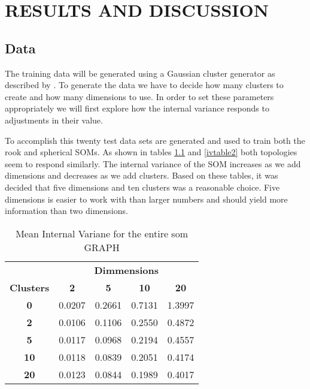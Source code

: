 \chapter{RESULTS AND DISCUSSION}
\section{Data}
The training data will be generated using a Gaussian cluster generator as
described by \cite{handl}.  To generate the data we have to decide how many
clusters to create and how many dimensions to use.  In order to set these
parameters appropriately we will first explore how the internal variance
responds to adjustments in their value.

To accomplish this twenty test data sets are generated and used to train both
the rook and spherical SOMs. As shown in tables \ref{ivtable1} and
\ref{ivtable2} both topologies seem to respond similarly. The internal
variance of the SOM increases as we add dimensions and decreases as we add
clusters. Based on these tables, it was decided that five dimensions and ten
clusters was a reasonable choice. Five dimensions is easier to work with than
larger numbers and should yield more information than two dimensions. 


\begin{table}
\centering
\caption{Mean Internal Variane for the entire som GRAPH}
\label{ivtable1}
\begin{tabular}{|c||c|c|c|c|}
\hline
&\multicolumn{4}{c|}{\textbf{Dimmensions}}\\
\textbf{Clusters} & \multicolumn{1}{c}{\textbf{2}} &
\multicolumn{1}{c}{\textbf{5}} & \multicolumn{1}{c}{\textbf{10}} &
\multicolumn{1}{c|}{\textbf{20}}\\
\hline
\hline
\textbf{0} & 0.0207& 0.2661& 0.7131& 1.3997 \\
\hline
\textbf{2} & 0.0106& 0.1106& 0.2550& 0.4872 \\
\hline
\textbf{5} & 0.0117& 0.0968& 0.2194& 0.4557 \\
\hline
\textbf{10} & 0.0118& 0.0839& 0.2051& 0.4174 \\
\hline
\textbf{20} & 0.0123& 0.0844& 0.1989& 0.4017 \\
\hline
\end{tabular} \end{table}


